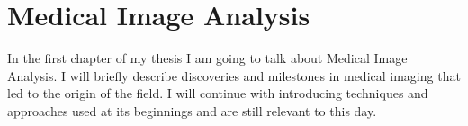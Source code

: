 \chapter{Medical Image Analysis}
\label{ch:medical-image-analysis}
In the first chapter of my thesis I am going to talk about Medical Image Analysis. I will briefly describe discoveries and milestones in medical imaging that led to the origin of the field. I will continue with introducing techniques and approaches used at its beginnings and are still relevant to this day. 



